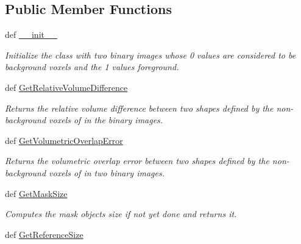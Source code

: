 \subsection*{Public Member Functions}
\begin{DoxyCompactItemize}
\item 
def \hyperlink{classmedpy_1_1metric_1_1volume_1_1Volume_ad5c463235786414fc4ff2b2157995722}{\_\-\_\-init\_\-\_\-}
\begin{DoxyCompactList}\small\item\em Initialize the class with two binary images whose 0 values are considered to be background voxels and the 1 values foreground. \end{DoxyCompactList}\item 
def \hyperlink{classmedpy_1_1metric_1_1volume_1_1Volume_ac1778f1c2a896936dc587e43da5dc6ab}{GetRelativeVolumeDifference}
\begin{DoxyCompactList}\small\item\em Returns the relative volume difference between two shapes defined by the non-\/background voxels of in the binary images. \end{DoxyCompactList}\item 
def \hyperlink{classmedpy_1_1metric_1_1volume_1_1Volume_a0b56a5881f4587543d6e12457700ad61}{GetVolumetricOverlapError}
\begin{DoxyCompactList}\small\item\em Returns the volumetric overlap error between two shapes defined by the non-\/background voxels of in two binary images. \end{DoxyCompactList}\item 
\hypertarget{classmedpy_1_1metric_1_1volume_1_1Volume_a71ceaa45f8287f4f1f811f2589218454}{
def \hyperlink{classmedpy_1_1metric_1_1volume_1_1Volume_a71ceaa45f8287f4f1f811f2589218454}{GetMaskSize}}
\label{classmedpy_1_1metric_1_1volume_1_1Volume_a71ceaa45f8287f4f1f811f2589218454}

\begin{DoxyCompactList}\small\item\em Computes the mask objects size if not yet done and returns it. \end{DoxyCompactList}\item 
\hypertarget{classmedpy_1_1metric_1_1volume_1_1Volume_ae2437de6098136c28250c9bdacc9a235}{
def \hyperlink{classmedpy_1_1metric_1_1volume_1_1Volume_ae2437de6098136c28250c9bdacc9a235}{GetReferenceSize}}
\label{classmedpy_1_1metric_1_1volume_1_1Volume_ae2437de6098136c28250c9bdacc9a235}


\end{DoxyCompactItemize}
